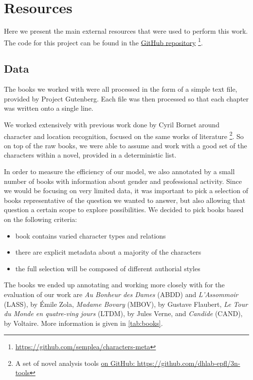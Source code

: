 \section{Resources}
Here we present the main external resources that were used to perform this work. The code for this project can be found in the \href{https://github.com/semplea/characters-meta}{GitHub repository} \footnote{\href{https://github.com/semplea/characters-meta}{https://github.com/semplea/characters-meta}}.

\subsection{Data} \label{ssec:data}
The books we worked with were all processed in the form of a simple text file, provided by Project Gutenberg. Each file was then processed so that each chapter was written onto a single line.

We worked extensively with previous work done by Cyril Bornet around character and location recognition, focused on the same works of literature \footnote{A set of novel analysis tools \href{https://github.com/dhlab-epfl/3n-tools}{on GitHub: https://github.com/dhlab-epfl/3n-tools}}. So on top of the raw books, we were able to assume and work with a good set of the characters within a novel, provided in a deterministic list.

In order to measure the efficiency of our model, we also annotated by a small number of books with information about gender and professional activity. Since we would be focusing on very limited data, it was important to pick a selection of books representative of the question we wanted to answer, but also allowing that question a certain scope to explore possibilities. We decided to pick books based on the following criteria:
\begin{itemize}
\item book contains varied character types and relations 
\item there are explicit metadata about a majority of the characters
\item the full selection will be composed of different authorial styles 
\end{itemize}

The books we ended up annotating and working more closely with for the evaluation of our work are \textit{Au Bonheur des Dames} (ABDD) and \textit{L'Assommoir} (LASS), by Émile Zola, \textit{Madame Bovary} (MBOV), by Gustave Flaubert, \textit{Le Tour du Monde en quatre-ving jours} (LTDM), by Jules Verne, and \textit{Candide} (CAND), by Voltaire. More information is given in \cref{tab:books}. 

